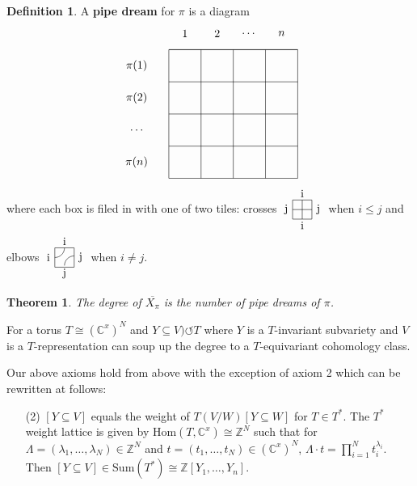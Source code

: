 \documentclass[12pt]{amsart}
\numberwithin{equation}{section}
\newtheorem{Theorem}[equation]{Theorem}
\theoremstyle{definition}
\newtheorem{Definition}[equation]{Definition}
\numberwithin{figure}{section}
\newcommand{\C}{\mathbb{C}}
\newcommand{\Z}{\mathbb{Z}}
\begin{document}
\begin{Definition}
	A \textbf{pipe dream} for $\pi$ is a diagram $$\vcenter{\hbox{\begin{tikzpicture}
				\draw[-] (1,4) to (5,4);
				\draw[-] (5,4) to (5,0);
				\draw[-] (5,0) to (1,0);
				\draw[-] (1,0) to (1,4);
				\node (1) at (1.5,4.5) {$1$};
				\node (2) at (2.5,4.5) {$2$};
				\node (...) at (3.5,4.5) {$\cdots$};
				\node (n) at (4.5,4.5) {$n$};
				\node (p1) at (0,3.5) {$\pi(1)$};
				\node (p2) at (0,2.5) {$\pi(2)$};
				\node (p) at (0,1.5) {$\hdots$};
				\node (pn) at (0,.5) {$\pi(n)$};
				\draw[-] (2,4) to (2,0);
				\draw[-] (3,4) to (3,0);
				\draw[-] (4,4) to (4,0);
				\draw[-] (1,1) to (5,1);
				\draw[-] (1,2) to (5,2);
				\draw[-] (1,3) to (5,3);
				\draw[-] (1,4) to (5,4);
	\end{tikzpicture}}}$$
	where each box is filed in with one of two tiles: crosses $\vcenter{\hbox{\begin{tikzpicture}
				\node at (0,.5) {j};
				\node at (.5,1) {i};
				\node at (1,.5) {j};
				\node at (.5,0) {i};
				\draw[-] (.2,.2) to (.2,.8);
				\draw[-] (.2,.8) to (.8,.8);
				\draw[-] (.8,.8) to (.8,.2);
				\draw[-] (.8,.2) to (.2,.2);
				\draw[-] (.2,.5) to (.8,.5);
				\draw[-] (.5,.2) to (.5,.8);
	\end{tikzpicture}}}$ when $i\leq j$ and elbows $\vcenter{\hbox{\begin{tikzpicture}
				\node at (0,.5) {i};
				\node at (.5,1) {i};
				\node at (1,.5) {j};
				\node at (.5,0) {j};
				\draw[-] (.2,.2) to (.2,.8);
				\draw[-] (.2,.8) to (.8,.8);
				\draw[-] (.8,.8) to (.8,.2);
				\draw[-] (.8,.2) to (.2,.2);
				\draw (.2,.5) arc[start angle=-90, end angle=0, radius=.3];
				\draw (.5,.25) arc[start angle=180, end angle=90, radius=.3];
	\end{tikzpicture}}}$ when $i\neq j$.
\end{Definition}

\begin{Theorem}
	The degree of $\overline{X_\pi}$ is the number of pipe dreams of $\pi$.
\end{Theorem}
For a torus $T\cong (\C^x)^N$ and $Y\subseteq V)\circlearrowleft T$ where $Y$ is a $T$-invariant subvariety and $V$ is a $T$-representation can soup up the degree to a $T$-equivariant cohomology class. 

Our above axioms hold from above with the exception of axiom 2 which can be rewritten at follows: \begin{enumerate}
	\item[(2)] $[Y\subseteq V]$ equals the weight of $T(V/W)[Y\subseteq W]$ for $T\in T^*$. The $T^*$ weight lattice is given by Hom$(T,\C^x)\cong\Z^N$ such that for $\Lambda=(\lambda_1,\ldots,\lambda_N)\in\Z^N$ and $t=(t_1,\ldots,t_N)\in(\C^x)^N$, $\Lambda\cdot t=\prod\limits_{i=1}^N t_i^{\lambda_i}$. Then $[Y\subseteq V]\in\text{Sum}(T^*)\cong\Z[Y_1,\ldots,Y_n]$.
\end{enumerate}
\end{document}
